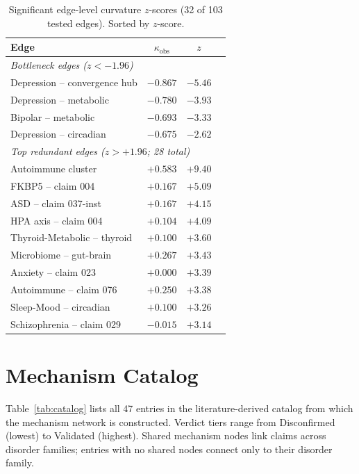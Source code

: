 \documentclass{article}
\begin{document}
\begin{table}[h]
\centering
\caption{Significant edge-level curvature $z$-scores (32 of 103 tested edges). Sorted by $z$-score.}
\label{tab:edge_full}
\small
\begin{tabular}{lccc}
\toprule
Edge & $\kappa_{\text{obs}}$ & $z$ \\
\midrule
\multicolumn{3}{l}{\emph{Bottleneck edges ($z < -1.96$)}} \\
Depression -- convergence hub & $-0.867$ & $\mathbf{-5.46}$ \\
Depression -- metabolic & $-0.780$ & $\mathbf{-3.93}$ \\
Bipolar -- metabolic & $-0.693$ & $-3.33$ \\
Depression -- circadian & $-0.675$ & $-2.62$ \\
\midrule
\multicolumn{3}{l}{\emph{Top redundant edges ($z > +1.96$; 28 total)}} \\
Autoimmune cluster & $+0.583$ & $\mathbf{+9.40}$ \\
FKBP5 -- claim 004 & $+0.167$ & $+5.09$ \\
ASD -- claim 037-inst & $+0.167$ & $+4.15$ \\
HPA axis -- claim 004 & $+0.104$ & $+4.09$ \\
Thyroid-Metabolic -- thyroid & $+0.100$ & $+3.60$ \\
Microbiome -- gut-brain & $+0.267$ & $+3.43$ \\
Anxiety -- claim 023 & $+0.000$ & $+3.39$ \\
Autoimmune -- claim 076 & $+0.250$ & $+3.38$ \\
Sleep-Mood -- circadian & $+0.100$ & $+3.26$ \\
Schizophrenia -- claim 029 & $-0.015$ & $+3.14$ \\
\bottomrule
\end{tabular}
\end{table}

\section{Mechanism Catalog}
\label{app:catalog}

Table~\ref{tab:catalog} lists all 47 entries in the literature-derived catalog from which the mechanism network is constructed. Verdict tiers range from Disconfirmed (lowest) to Validated (highest). Shared mechanism nodes link claims across disorder families; entries with no shared nodes connect only to their disorder family.
\end{document}
